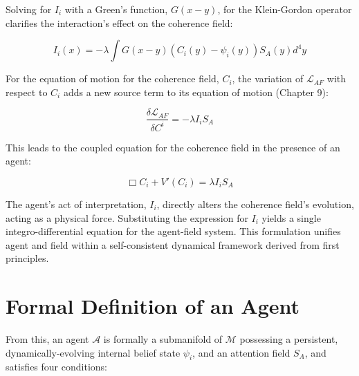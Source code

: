 Solving for \(I_i\) with a Green's function, \(G(x-y)\), for the Klein-Gordon operator clarifies the interaction's effect on the coherence field:

\begin{equation}
I_i(x) = -\lambda \int G(x-y) \left( C_i(y) - \psi_i(y) \right) S_A(y) d^4y
\end{equation}

For the equation of motion for the coherence field, \(C_i\), the variation of \(\mathcal{L}_{AF}\) with respect to \(C_i\) adds a new source term to its equation of motion (Chapter 9):

\begin{equation}
\frac{\delta \mathcal{L}_{AF}}{\delta C^i} = -\lambda I_i S_A
\end{equation}

This leads to the coupled equation for the coherence field in the presence of an agent:

\begin{equation}
\Box C_i + V'(C_i) = \lambda I_i S_A
\end{equation}

The agent's act of interpretation, \(I_i\), directly alters the coherence field's evolution, acting as a physical force. Substituting the expression for \(I_i\) yields a single integro-differential equation for the agent-field system. This formulation unifies agent and field within a self-consistent dynamical framework derived from first principles.

\section{Formal Definition of an Agent}

From this, an agent \(\mathcal{A}\) is formally a submanifold of \(\mathcal{M}\) possessing a persistent, dynamically-evolving internal belief state \(\psi_i\), and an attention field \(S_A\), and satisfies four conditions:

